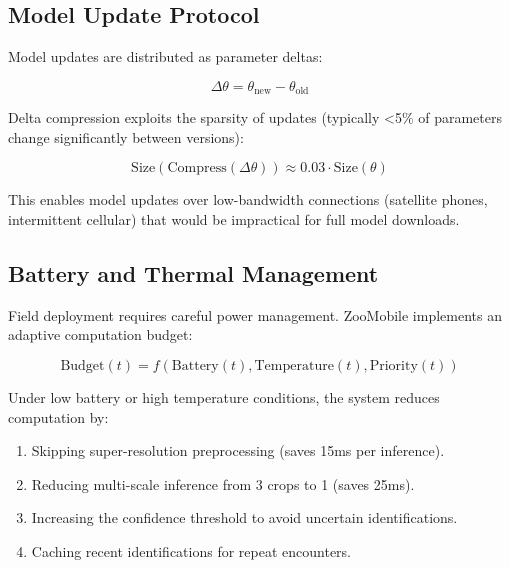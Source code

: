 \subsection{Model Update Protocol}

Model updates are distributed as parameter deltas:

\begin{equation}
    \Delta\theta = \theta_{\text{new}} - \theta_{\text{old}}
\end{equation}

Delta compression exploits the sparsity of updates (typically <5\% of parameters change significantly between versions):

\begin{equation}
    \text{Size}(\text{Compress}(\Delta\theta)) \approx 0.03 \cdot \text{Size}(\theta)
\end{equation}

This enables model updates over low-bandwidth connections (satellite phones, intermittent cellular) that would be impractical for full model downloads.

\subsection{Battery and Thermal Management}

Field deployment requires careful power management.
ZooMobile implements an adaptive computation budget:

\begin{equation}
    \text{Budget}(t) = f(\text{Battery}(t), \text{Temperature}(t), \text{Priority}(t))
\end{equation}

Under low battery or high temperature conditions, the system reduces computation by:
\begin{enumerate}[leftmargin=*]
    \item Skipping super-resolution preprocessing (saves 15ms per inference).
    \item Reducing multi-scale inference from 3 crops to 1 (saves 25ms).
    \item Increasing the confidence threshold to avoid uncertain identifications.
    \item Caching recent identifications for repeat encounters.
\end{enumerate}

